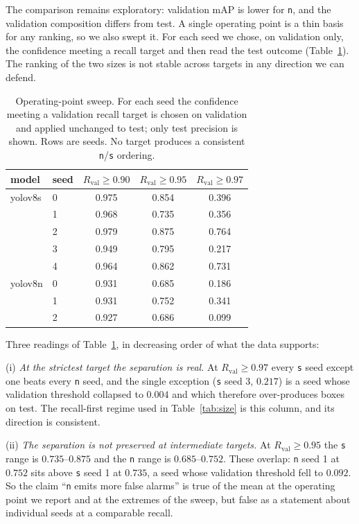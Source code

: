 The comparison remains exploratory: validation mAP is lower for \texttt{n}, and
the validation composition differs from test. A single operating point is a thin
basis for any ranking, so we also swept it. For each seed we chose, on validation
only, the confidence meeting a recall target and then read the test outcome
(Table~\ref{tab:sweep}). The ranking of the two sizes is not stable across
targets in any direction we can defend.

\begin{table}[t]
\centering
\small
\caption{Operating-point sweep. For each seed the confidence meeting a validation
recall target is chosen on validation and applied unchanged to test; only test
precision is shown. Rows are seeds. No target produces a consistent
\texttt{n}/\texttt{s} ordering.}
\label{tab:sweep}
\setlength{\tabcolsep}{5pt}
\begin{tabular}{llccc}
\toprule
model & seed & $R_{\text{val}}\!\ge\!0.90$ & $R_{\text{val}}\!\ge\!0.95$ & $R_{\text{val}}\!\ge\!0.97$ \\
\midrule
yolov8s & 0 & 0.975 & 0.854 & 0.396 \\
        & 1 & 0.968 & 0.735 & 0.356 \\
        & 2 & 0.979 & 0.875 & 0.764 \\
        & 3 & 0.949 & 0.795 & 0.217 \\
        & 4 & 0.964 & 0.862 & 0.731 \\
\midrule
yolov8n & 0 & 0.931 & 0.685 & 0.186 \\
        & 1 & 0.931 & 0.752 & 0.341 \\
        & 2 & 0.927 & 0.686 & 0.099 \\
\bottomrule
\end{tabular}
\end{table}

Three readings of Table~\ref{tab:sweep}, in decreasing order of what the data
supports:

(i) \emph{At the strictest target the separation is real.} At
$R_{\text{val}}\ge0.97$ every \texttt{s} seed except one beats every \texttt{n}
seed, and the single exception (\texttt{s} seed 3, $0.217$) is a seed whose
validation threshold collapsed to $0.004$ and which therefore over-produces boxes
on test. The recall-first regime used in Table~\ref{tab:size} is this column, and
its direction is consistent.

(ii) \emph{The separation is not preserved at intermediate targets.} At
$R_{\text{val}}\ge0.95$ the \texttt{s} range is $0.735$--$0.875$ and the
\texttt{n} range is $0.685$--$0.752$. These overlap: \texttt{n} seed 1 at $0.752$
sits above \texttt{s} seed 1 at $0.735$, a seed whose validation threshold fell to
$0.092$. So the claim ``\texttt{n} emits more false alarms'' is true of the mean at
the operating point we report and at the extremes of the sweep, but false as a
statement about individual seeds at a comparable recall.

